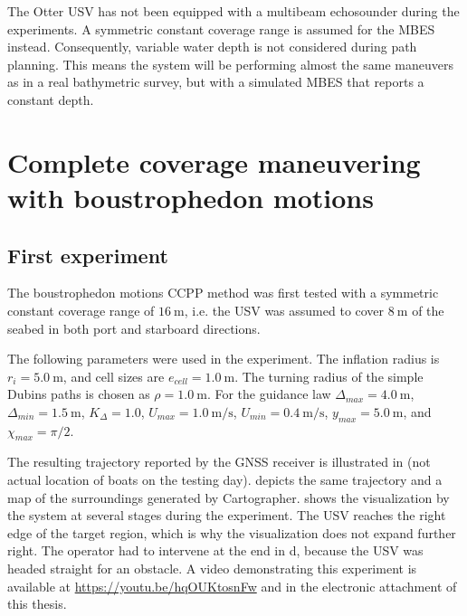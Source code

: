 The Otter USV has not been equipped with a multibeam echosounder during the experiments.  A symmetric constant coverage range is assumed for the MBES instead. Consequently, variable water depth is not considered during path planning. This means the system will be performing almost the same maneuvers as in a real bathymetric survey, but with a simulated MBES that reports a constant depth.

\section{Complete coverage maneuvering with boustrophedon motions}

\subsection{First experiment}

The boustrophedon motions CCPP method was first tested with a symmetric constant coverage range of $\SI{16}{\meter}$, i.e. the USV was assumed to cover $\SI{8}{\meter}$ of the seabed in both port and starboard directions. 

The following parameters were used in the experiment. The inflation radius is $r_i = \SI{5.0}{\meter}$, and cell sizes are $e_{cell} = \SI{1.0}{\meter}$. The turning radius of the simple Dubins paths is chosen as $\rho = \SI{1.0}{\meter}$. For the guidance law $\Delta_{max} = \SI{4.0}{\meter}$, $\Delta_{min} = \SI{1.5}{\meter}$, $K_\Delta = 1.0$, $U_{max} = \SI{1.0}{\meter/\second}$, $U_{min} = \SI{0.4}{\meter/\second}$, $y_{max} = \SI{5.0}{\meter}$, and $\chi_{max} = \pi/2$.

The resulting trajectory reported by the GNSS receiver is illustrated in  (not actual location of boats on the testing day).  depicts the same trajectory and a map of the surroundings generated by Cartographer.  shows the visualization by the system at several stages during the experiment. The USV reaches the right edge of the target region, which is why the visualization does not expand further right. The operator had to intervene at the end in d, because the USV was headed straight for an obstacle. A video demonstrating this experiment is available at \url{https://youtu.be/hqOUKtosnFw} and in the electronic attachment of this thesis.

